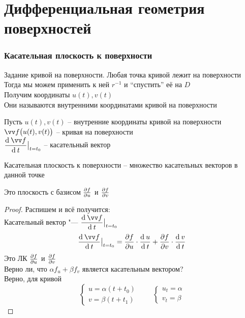 \part{Дифференциальная геометрия поверхностей}

\section{Касательная плоскость к поверхности}

\begin{undefthm}{Задание кривой на поверхности.}
	Любая точка кривой лежит на поверхности \\
	Тогда мы можем применить к ней $ r^{-1} $ и ``спустить'' её на $ D $ \\
	Получим координаты $ u(t), v(t) $ \\
	Они называются внутренними координатами кривой на поверхности
\end{undefthm}

\begin{definition}
	Пусть $ u(t), v(t) $ -- внутренние координаты кривой на поверхности \\
	$ \vv f \big( u(t), v(t) \big) $ -- кривая на поверхности \\
	$ \dfrac{\di \vv f}{\di t}\clamp{t = t_0} $ -- касательный вектор
\end{definition}

\begin{definition}
	Касательная плоскость к поверхности -- множество касательных векторов в данной точке
\end{definition}

\begin{statement}
	Это плоскость с базисом $ \frac{\partial {f}}{\partial {u}} $ и $ \frac{\partial {f}}{\partial {v}} $
\end{statement}

\begin{proof}
	Распишем и всё получится: \\
	Касательный вектор "--- $ \dfrac{\di \vv f}{\di t}\clamp{t = t_0} $
	$$ \dfrac{\di \vv f}{\di t}\clamp{t = t_0} = \pder fu \cdot \frac{\di u}{\di t} + \pder fv \cdot \frac{\di v}{\di t} $$
	Это ЛК $ \frac{\partial {f}}{\partial {u}} $ и $ \frac{\partial {f}}{\partial {v}} $ \\
	Верно ли, что $ \alpha f_u + \beta f_v $ является касательным вектором? \\
	Верно, для кривой
	$$
	\begin{cases}
		u = \alpha(t + t_0) \\
		v = \beta(t + t_1)
	\end{cases} \qquad
	\begin{cases}
		u_t = \alpha \\
		v_t = \beta
	\end{cases} $$
\end{proof}

